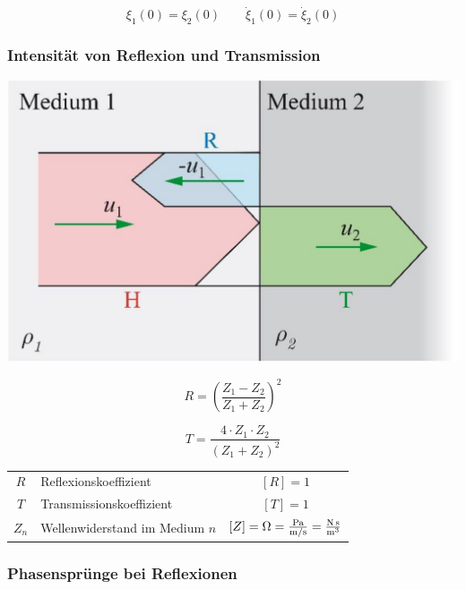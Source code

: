 $$ \xi_1(0) = \xi_2(0) \qquad \dot{\xi}_1(0) = \dot{\xi}_2(0) $$




\subsubsection{Intensität von Reflexion und Transmission}

\begin{minipage}{0.48\linewidth}
	\includegraphics[width=0.9\linewidth]{Bilder/Wellen-Optik/reflexionskoeffizient_transmissionskoeffizient} \\
\end{minipage}
\hfill
\begin{minipage}{0.48\linewidth}
	$$ \boxed{ R = \left(  \frac{Z_1 - Z_2}{Z_1 + Z_2}  \right)^2  } $$

	$$ \boxed{ T = \frac{ 4 \cdot Z_1 \cdot
	Z_2}{(Z_1 + Z_2)^2}   } $$
\end{minipage}

\vspace{0.2cm}


\renewcommand{\arraystretch}{1.1}
\begin{tabular}{clc}
$R$ & Reflexionskoeffizient  & $[R] = 1$ \\
$T$ & Transmissionskoeffizient & $[T] = 1 $ \\
$Z_n$ & Wellenwiderstand im Medium $n$ & $[Z] = \mathrm{\Omega} = \frac{\mathrm{Pa}}{\mathrm{m} / \mathrm{s}} = \frac{\mathrm{N} \, \mathrm{s}}{\mathrm{m}^3}$ \\
\end{tabular}
\renewcommand{\arraystretch}{1}



\subsubsection{Phasensprünge bei Reflexionen}

